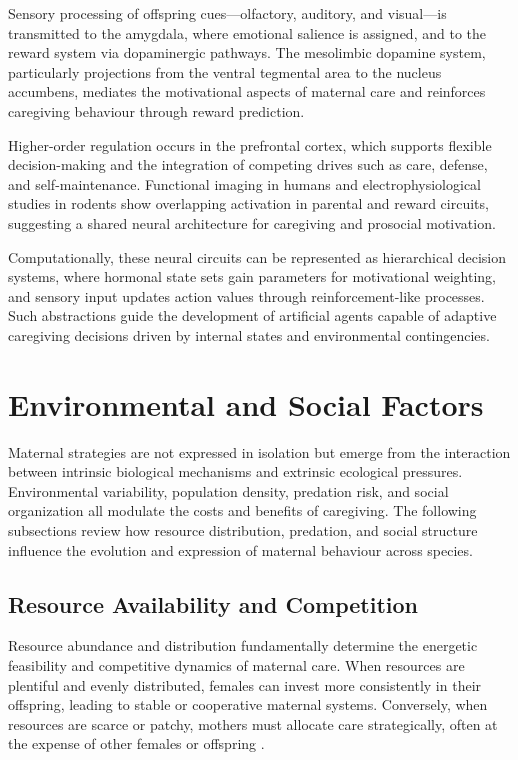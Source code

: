         Sensory processing of offspring cues—olfactory, auditory, and visual—is transmitted to the amygdala, where emotional salience is assigned, and to the reward system via dopaminergic pathways.  The mesolimbic dopamine system, particularly projections from the ventral tegmental area to the nucleus accumbens, mediates the motivational aspects of maternal care and reinforces caregiving behaviour through reward prediction.
        
        Higher-order regulation occurs in the prefrontal cortex, which supports flexible decision-making and the integration of competing drives such as care, defense, and self-maintenance.  Functional imaging in humans and electrophysiological studies in rodents show overlapping activation in parental and reward circuits, suggesting a shared neural architecture for caregiving and prosocial motivation.
        
        Computationally, these neural circuits can be represented as hierarchical decision systems, where hormonal state sets gain parameters for motivational weighting, and sensory input updates action values through reinforcement-like processes.  Such abstractions guide the development of artificial agents capable of adaptive caregiving decisions driven by internal states and environmental contingencies.


\section{Environmental and Social Factors}
Maternal strategies are not expressed in isolation but emerge from the interaction between intrinsic biological mechanisms and extrinsic ecological pressures.  Environmental variability, population density, predation risk, and social organization all modulate the costs and benefits of caregiving.  The following subsections review how resource distribution, predation, and social structure influence the evolution and expression of maternal behaviour across species.

    \subsection{Resource Availability and Competition}
        Resource abundance and distribution fundamentally determine the energetic feasibility and competitive dynamics of maternal care. When resources are plentiful and evenly distributed, females can invest more consistently in their offspring, leading to stable or cooperative maternal systems. Conversely, when resources are scarce or patchy, mothers must allocate care strategically, often at the expense of other females or offspring \cite{emlen1977, cluttonbrock2016}.  

